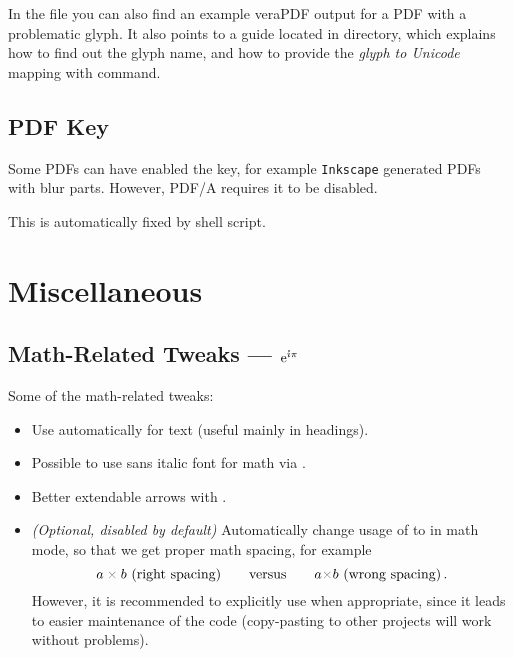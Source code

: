 In the  file you can also find an example \textsf{veraPDF} output for a PDF with a problematic glyph.
It also points to a guide located in  directory, which explains how to find out the glyph name, and how to provide the \emph{glyph to Unicode} mapping with \macro{\pdfglyphtounicode} command.


\subsection{PDF \texorpdfstring{}{/Interpolation} Key}%
\label{sub:PDF Interpolation Key}

Some PDFs can have enabled the  key, for example \texttt{Inkscape} generated PDFs with blur parts.
However, PDF/A requires it to be disabled.

This is automatically fixed by  shell script.


\section{Miscellaneous}%
\label{sec:Miscellaneous}

\subsection{Math-Related Tweaks --- \texorpdfstring{\rmfamily\(\E^{\I\pi}\)}{exp(iπ)}}%
\label{sub:Math Macros}

Some of the math-related tweaks:
\begin{itemize}
    \item Use \macro{\boldmath} automatically for \macro{\textbf} text (useful mainly in headings).
    \item Possible to use sans italic font for math via \custommacro{\mathsfit}.
    \item Better extendable arrows with .
    \item \emph{(Optional, disabled by default)} Automatically change usage of \macro{\textcolor} to \macro{\mathcolor} in math mode, so that we get proper math spacing, for example
          \[ a \mathcolor{gray}{\times} b \text{ (right spacing)} \qquad\text{versus}\qquad a \textcolor{gray}{\times} b \text{ (wrong spacing)}\eqend \]
          However, it is recommended to explicitly use \macro{\mathcolor} when appropriate, since it leads to easier maintenance of the code (copy-pasting to other projects will work without problems).
\end{itemize}


